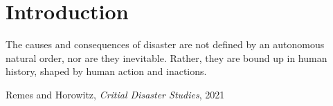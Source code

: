 \chapter{Introduction}
\label{ch: introduction}

\vspace{0.66cm}

\setlength{\beforeepigraphskip}{0pt}  %
\setlength{\afterepigraphskip}{0pt}   %

\setlength{\epigraphwidth}{0.95\textwidth}
\epigraph{%
  The causes and consequences of disaster are not defined by an autonomous natural order, nor are they inevitable. Rather, they are bound up in human history, shaped by human action and inactions.%
}{Remes and Horowitz, \textit{Critial Disaster Studies}, 2021}

\vspace{0.66cm}


